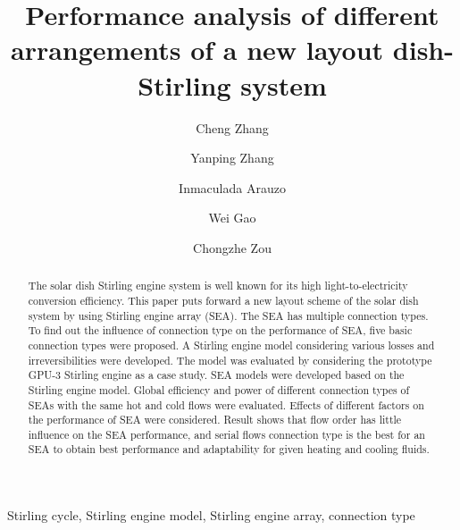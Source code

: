 \documentclass[review,3p,10t]{elsarticle}
\begin{document}
\begin{frontmatter}
\title{Performance analysis of different arrangements of a new layout dish-Stirling system}
\date{}
\author[label1]{Cheng Zhang}
\author[label1]{Yanping Zhang}
\author[label2]{Inmaculada Arauzo}
\author[label1]{Wei Gao}
\author[label1]{Chongzhe Zou}


\address[label1]{School of Energy and Power Engineering, Huazhong University of Science and Technology, Wuhan, China}
\address[label2]{CIRCE Research Institute, University of Zaragoza, Maria de Luna, Zaragoza, Spain}

\begin{abstract}
The solar dish Stirling engine system is well known for its high light-to-electricity conversion efficiency. This paper puts forward a new layout scheme of the solar dish system by using Stirling engine array (SEA). The SEA has multiple connection types. To find out the influence of connection type on the performance of SEA, five basic connection types were proposed. A Stirling engine model considering various losses and irreversibilities were developed. The model was evaluated by considering the prototype GPU-3 Stirling engine as a case study. SEA models were developed based on the Stirling engine model. Global efficiency and power of different connection types of SEAs with the same hot and cold flows were evaluated. Effects of different factors on the performance of SEA were considered. Result shows that flow order has little influence on the SEA performance, and serial flows connection type is the best for an SEA to obtain best performance and adaptability for given heating and cooling fluids.
\end{abstract}

\begin{keyword}Stirling cycle, Stirling engine model, Stirling engine array, connection type
\end{keyword}

\end{frontmatter}

\linenumbers
\end{document}
